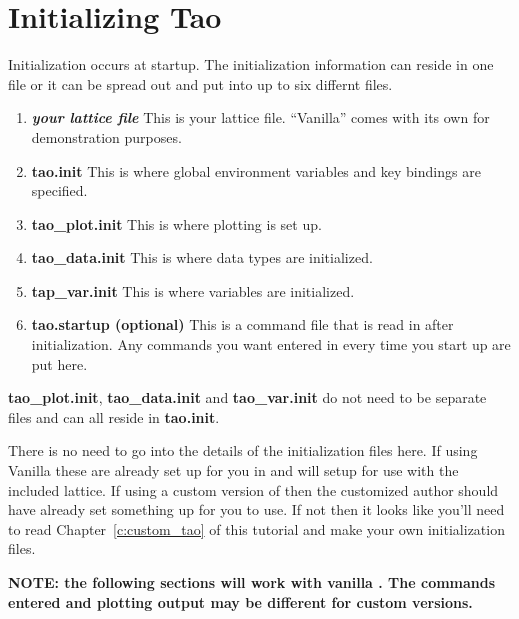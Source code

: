\section{Initializing Tao}
\label{s:initializing}

Initialization occurs at startup. The initialization information can reside
in one file or it can be spread out and put into up to six differnt files.
  \vspace*{-2ex}
\begin{enumerate}
  \item \textbf{\textit{your lattice file}} \Newline
    This is your lattice file. ``Vanilla'' \tao comes with its own for
    demonstration purposes.
  \item \textbf{tao.init} \Newline 
    This is where global environment variables and key bindings are specified.
  \item \textbf{tao\_plot.init} \Newline
    This is where plotting is set up.
  \item \textbf{tao\_data.init} \Newline
    This is where data types are initialized.
  \item \textbf{tap\_var.init} \Newline
    This is where variables are initialized.
  \item \textbf{tao.startup (optional)} \Newline
    This is a command file that is read in after initialization. 
    Any commands you
    want entered in \tao every time you start up are put here.
\end{enumerate}
\textbf{tao\_plot.init}, \textbf{tao\_data.init} and
\textbf{tao\_var.init} do not need to be separate files and can all
reside in \textbf{tao.init}.

There is no need to go into the details of the initialization files
here. If using Vanilla \tao these are already set up for you in
 and will setup \tao for use with the included
\cesr lattice. If using a custom version of \tao then the customized
\tao author should have already set something up for you to use. If
not then it looks like you'll need to read Chapter~\ref{c:custom_tao}
of this tutorial and make your own initialization files.

\textbf{NOTE: the following sections will work with vanilla \tao. The
commands entered and plotting output may be different for custom
versions.}

